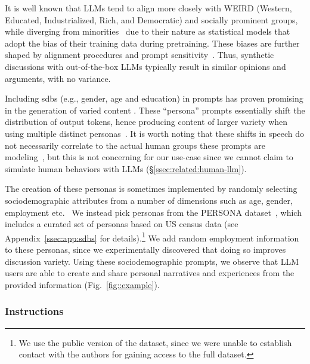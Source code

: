 It is well known that LLMs tend to align more closely with WEIRD (Western, Educated, Industrialized, Rich, and Democratic) and socially prominent groups, while diverging from minorities~\cite{sap-etal-2022-annotators,goyal2022_toxicity,gallegos-etal-2024-bias} due to their nature as statistical models that adopt the bias of their training data during pretraining. These biases are further shaped by alignment procedures and prompt sensitivity~\cite{liu_2024_bias,santukar_2023}. Thus, synthetic discussions with out-of-the-box LLMs typically result in similar opinions and arguments, with no variance. 

Including \acp{sdb} (e.g., gender, age and education) in prompts has proven promising in the generation of varied content \cite{burton2024large,sommerauer-etal-2025-simulating}. These ``persona'' prompts essentially shift the distribution of output tokens, hence producing content of larger variety when using multiple distinct personas~\cite{liu_2024_bias}. It is worth noting that these shifts in speech do not necessarily correlate to the actual human groups these prompts are modeling~\cite{lutz-etal-2025-prompt,liu_2024_bias}, but this is not concerning for our use-case since we cannot claim to simulate human behaviors with LLMs (\S\ref{ssec:related:human-llm}).

The creation of these personas is sometimes implemented by randomly selecting sociodemographic attributes from a number of dimensions such as age, gender, employment etc.~\cite{adornetto2025_gabms} We instead pick personas from the PERSONA dataset~\cite{castricato-etal-2025-persona}, which includes a curated set of personas based on US census data (see Appendix~\ref{ssec:app:sdbs} for details).\footnote{We use the public version of the dataset, since we were unable to establish contact with the authors for gaining access to the full dataset.} We add random employment information to these personas, since we experimentally discovered that doing so improves discussion variety. Using these sociodemographic prompts, we observe that LLM users are able to create and share personal narratives and experiences from the provided information (Fig.~\ref{fig::example}). 


\subsubsection{Instructions}

